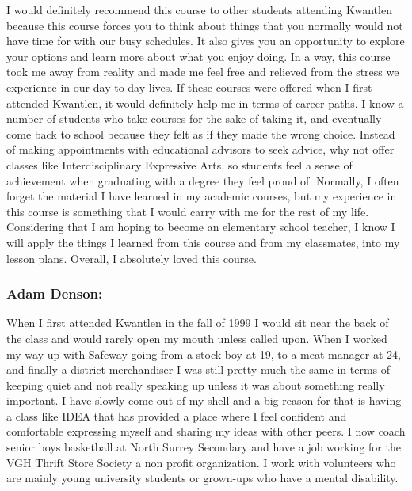 \documentclass[letterpaper,10pt,headsepline]{scrreprt}
\begin{document}
I would definitely recommend this course to other students attending Kwantlen because this course forces you to think about things that you normally would not have time for with our busy schedules. It also gives you an opportunity to explore your options and learn more about what you enjoy doing. In a way, this course took me away from reality and made me feel free and relieved from the stress we experience in our day to day lives. If these courses were offered when I first attended Kwantlen, it would definitely help me in terms of career paths. I know a number of students who take courses for the sake of taking it, and eventually come back to school because they felt as if they made the wrong choice. Instead of making appointments with educational advisors to seek advice, why not offer classes like Interdisciplinary Expressive Arts, so students feel a sense of achievement when graduating with a degree they feel proud of. Normally, I often forget the material I have learned in my academic courses, but my experience in this course is something that I would carry with me for the rest of my life. Considering that I am hoping to become an elementary school teacher, I know I will apply the things I learned from this course and from my classmates, into my lesson plans. Overall, I absolutely loved this course. 

\subsubsection{Adam Denson:}

 When I first attended Kwantlen in the fall of 1999 I would sit near the back of the class and would rarely open my mouth unless called upon. When I worked my way up with Safeway going from a stock boy at 19, to a meat manager at 24, and finally a district merchandiser I was still pretty much the same in terms of keeping quiet and not really speaking up unless it was about something really important. I have slowly come out of my shell and a big reason for that is having a class like IDEA that has provided a place where I feel confident and comfortable expressing myself and sharing my ideas with other peers. I now coach senior boys basketball at North Surrey Secondary and have a job working for the VGH Thrift Store Society a non profit organization. I work with volunteers who are mainly young university students or grown-ups who have a mental disability.
\end{document}
